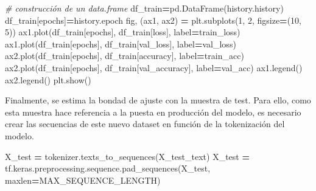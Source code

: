 \documentclass[
  a4paper,
  DIV=11,
  numbers=noendperiod]{scrreprt}
\newenvironment{Shaded}{\begin{snugshade}}{\end{snugshade}}
\newcommand{\CommentTok}[1]{\textcolor[rgb]{0.56,0.35,0.01}{\textit{#1}}}
\newcommand{\DecValTok}[1]{\textcolor[rgb]{0.00,0.00,0.81}{#1}}
\newcommand{\NormalTok}[1]{#1}
\newcommand{\OperatorTok}[1]{\textcolor[rgb]{0.81,0.36,0.00}{\textbf{#1}}}
\newcommand{\StringTok}[1]{\textcolor[rgb]{0.31,0.60,0.02}{#1}}
\begin{document}
\begin{Shaded}
\begin{Highlighting}[numbers=left,,]
\CommentTok{\# construcción de un data.frame}
\NormalTok{df\_train}\OperatorTok{=}\NormalTok{pd.DataFrame(history.history)}
\NormalTok{df\_train[}\StringTok{\textquotesingle{}epochs\textquotesingle{}}\NormalTok{]}\OperatorTok{=}\NormalTok{history.epoch}
\NormalTok{fig, (ax1, ax2) }\OperatorTok{=}\NormalTok{ plt.subplots(}\DecValTok{1}\NormalTok{, }\DecValTok{2}\NormalTok{, figsize}\OperatorTok{=}\NormalTok{(}\DecValTok{10}\NormalTok{, }\DecValTok{5}\NormalTok{))}
\NormalTok{ax1.plot(df\_train[}\StringTok{\textquotesingle{}epochs\textquotesingle{}}\NormalTok{], df\_train[}\StringTok{\textquotesingle{}loss\textquotesingle{}}\NormalTok{], label}\OperatorTok{=}\StringTok{\textquotesingle{}train\_loss\textquotesingle{}}\NormalTok{)}
\NormalTok{ax1.plot(df\_train[}\StringTok{\textquotesingle{}epochs\textquotesingle{}}\NormalTok{], df\_train[}\StringTok{\textquotesingle{}val\_loss\textquotesingle{}}\NormalTok{], label}\OperatorTok{=}\StringTok{\textquotesingle{}val\_loss\textquotesingle{}}\NormalTok{)}
\NormalTok{ax2.plot(df\_train[}\StringTok{\textquotesingle{}epochs\textquotesingle{}}\NormalTok{], df\_train[}\StringTok{\textquotesingle{}accuracy\textquotesingle{}}\NormalTok{], label}\OperatorTok{=}\StringTok{\textquotesingle{}train\_acc\textquotesingle{}}\NormalTok{)}
\NormalTok{ax2.plot(df\_train[}\StringTok{\textquotesingle{}epochs\textquotesingle{}}\NormalTok{], df\_train[}\StringTok{\textquotesingle{}val\_accuracy\textquotesingle{}}\NormalTok{], label}\OperatorTok{=}\StringTok{\textquotesingle{}val\_acc\textquotesingle{}}\NormalTok{)}
\NormalTok{ax1.legend()}
\NormalTok{ax2.legend()}
\NormalTok{plt.show()}
\end{Highlighting}
\end{Shaded}

Finalmente, se estima la bondad de ajuste con la muestra de test. Para
ello, como esta muestra hace referencia a la puesta en producción del
modelo, es necesario crear las secuencias de este nuevo dataset en
función de la tokenización del modelo.

\begin{Shaded}
\begin{Highlighting}[numbers=left,,]
\NormalTok{X\_test }\OperatorTok{=}\NormalTok{ tokenizer.texts\_to\_sequences(X\_test\_text)}
\NormalTok{X\_test }\OperatorTok{=}\NormalTok{ tf.keras.preprocessing.sequence.pad\_sequences(X\_test,}
\NormalTok{maxlen}\OperatorTok{=}\NormalTok{MAX\_SEQUENCE\_LENGTH)}
\end{Highlighting}
\end{Shaded}
\end{document}
